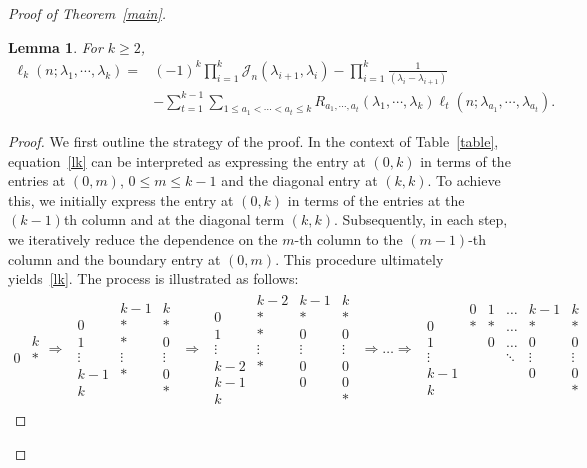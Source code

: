 \documentclass[a4paper]{article}
\theoremstyle{plain}
\newtheorem{lem}{Lemma}
\theoremstyle{definition}
\newcommand{\nn}{\nonumber}
\begin{document}
\begin{proof}[Proof of Theorem~\ref{main}]
\begin{lem}
	For $k\ge2$,
	\begin{align}
		\ell_k(n;\lambda_1,\cdots,\lambda_k)=&(-1)^k\prod_{i=1}^k\mathcal J_n(\lambda_{i+1},\lambda_i)-\prod_{i=1}^k\frac{1}{(\lambda_i-\lambda_{i+1})}\nn\\
		&-\sum_{t=1}^{k-1}\sum_{1\le a_1<\cdots<a_t\le k}R_{a_1,\cdots,a_t}(\lambda_1,\cdots,\lambda_k)\ell_t(n;\lambda_{a_1},\cdots,\lambda_{a_t}). \label{lk}
	\end{align}
\end{lem}
\begin{proof}
	We first outline the strategy of the proof. In the context of Table~\eqref{table}, equation~\eqref{lk} can be interpreted as expressing the entry at $(0,k)$ in terms of the entries at $(0,m)$, $0\le m\le k-1$ and the diagonal entry at $(k,k)$. To achieve this, we initially express the entry at $(0,k)$ in terms of the entries at the $(k-1)$th column and at the diagonal term $(k,k)$. Subsequently, in each step, we iteratively reduce the dependence on the $m$-th column to the $(m-1)$-th column and the boundary entry at $(0,m)$. This procedure ultimately yields~\eqref{lk}. The process is illustrated as follows:
	\[
	\begin{array}{c|c}
		 & k \\ \hline
		 0 & *
	\end{array}
	\Rightarrow
	\begin{array}{c}
		\begin{array}{c|cc}
			 & k-1 & k \\ \hline
			0 & * & * \\
			1 & * & 0 \\
			\vdots & \vdots & \vdots \\
			k-1 & * & 0 \\
			k & & * 
		\end{array}
	\end{array}
	\Rightarrow
	\begin{array}{c}
		\begin{array}{c|ccc}
			& k-2 & k-1 & k \\ \hline
			0 & * & * & * \\
			1 & * & 0 & 0 \\
			\vdots & \vdots & \vdots & \vdots \\
			k-2 & * & 0 & 0 \\
			k-1 & & 0 & 0 \\
			k & &  & * 
		\end{array}
	\end{array}
	\Rightarrow \dots \Rightarrow
	\begin{array}{c}
		\begin{array}{c|ccccc}
			& 0 & 1 & \dots & k-1 & k \\ \hline
			0 & * & * & \dots & * & * \\
			1 & & 0 & \dots & 0 & 0 \\
			\vdots & &  & \ddots & \vdots & \vdots \\
			k-1 & &  &  & 0 & 0 \\ 
			k & & &  & & * 
		\end{array}
	\end{array}
	\]
	

\end{proof}
\end{proof}
\end{document}
